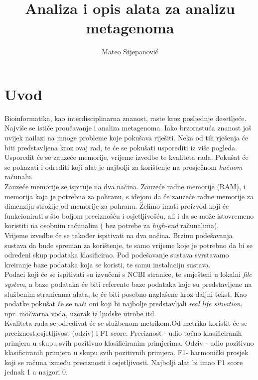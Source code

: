 \documentclass[times, utf8, seminar]{fer}
\begin{document}
\title{Analiza i opis alata za analizu metagenoma}

\author{Mateo Stjepanović}


\maketitle

\tableofcontents

\chapter{Uvod}
Bioinformatika, kao interdisciplinarna znanost, raste kroz posljednje desetljeće. Najviše se ističe proučavanje i analiza metagenoma. Iako brzorastuća znanost još uvijek nailazi na mnoge probleme koje pokušava riješiti. Neka od tih rješenja će biti predstavljena kroz ovaj rad, te će se pokušati usporediti iz više pogleda. Usporedit će se zauzeće memorije, vrijeme izvedbe te kvaliteta rada. Pokušat će se pokazati i odrediti koji alat je najbolji za korištenje na prosječnom \textit{kućnom} računalu.
\\Zauzeće memorije se ispituje na dva načina. Zauzeće radne memorije (RAM), i memorija koja je potrebna za pohranu, s idejom da će zauzeće radne memorije za dimenziju strožije od memorije za pohranu. Želimo imati proizvod koji će funkcionirati s što boljom preciznošću i osjetljivošću, ali i da se može istovremeno koristiti na osobnim računalim ( bez potrebe za \textit{high-end} računalima).
\\Vrijeme izvedbe će se također ispitivati na dva načina. Brzinu podešavanja sustava da bude spreman za korištenje, te samo vrijeme koje je potrebno da bi se određeni skup podataka klasificirao. Pod podešavanje sustava svrstavamo kreiranje baze podataka koja se koristi, te samu instalaciju sustava.
\\Podaci koji će se ispitivati su izvučeni s NCBI stranice, te smješteni u lokalni \textit{file system}, a baze podataka će biti referente baze podataka koje su predstavljene na službenim stranicama alata, te će biti posebno naglašene kroz daljni tekst. Kao podatke pokušat će se naći oni koji bi najbolje predstavljali \textit{real life situation}, npr. močvarna voda, uzorak iz ljudske utrobe itd.
\\Kvaliteta rada se određivat će se službenom metrikom.Od metrika koristit će se preciznost,osjetljivost (odziv) i F1 score. Preciznost - udio točno klasificiranih primjera u skupu svih pozitivno klasificiranim primjerima. Odziv - udio pozitivno klasificiranih primjera u skupu svih pozitivnih primjera. F1- harmonički prosjek koji se računa između preciznosti i osjetljivosti. Najbolji alat bi imao F1 score jednak 1 a najgori 0.
\end{document}

